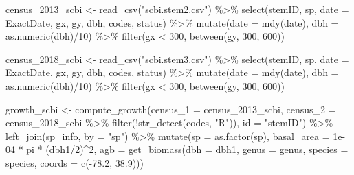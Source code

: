 \documentclass[12pt]{article}
\newenvironment{Shaded}{\begin{snugshade}}{\end{snugshade}}
\newcommand{\AttributeTok}[1]{\textcolor[rgb]{0.77,0.63,0.00}{#1}}
\newcommand{\DecValTok}[1]{\textcolor[rgb]{0.00,0.00,0.81}{#1}}
\newcommand{\FloatTok}[1]{\textcolor[rgb]{0.00,0.00,0.81}{#1}}
\newcommand{\FunctionTok}[1]{\textcolor[rgb]{0.00,0.00,0.00}{#1}}
\newcommand{\NormalTok}[1]{#1}
\newcommand{\OtherTok}[1]{\textcolor[rgb]{0.56,0.35,0.01}{#1}}
\newcommand{\SpecialCharTok}[1]{\textcolor[rgb]{0.00,0.00,0.00}{#1}}
\newcommand{\StringTok}[1]{\textcolor[rgb]{0.31,0.60,0.02}{#1}}
\begin{document}
\begin{Shaded}
\begin{Highlighting}[]
\NormalTok{census\_2013\_scbi }\OtherTok{\textless{}{-}} \FunctionTok{read\_csv}\NormalTok{(}\StringTok{"scbi.stem2.csv"}\NormalTok{) }\SpecialCharTok{\%\textgreater{}\%}
    \FunctionTok{select}\NormalTok{(stemID, sp, }\AttributeTok{date =}\NormalTok{ ExactDate, gx, gy, dbh, codes, status) }\SpecialCharTok{\%\textgreater{}\%}
    \FunctionTok{mutate}\NormalTok{(}\AttributeTok{date =} \FunctionTok{mdy}\NormalTok{(date), }\AttributeTok{dbh =} \FunctionTok{as.numeric}\NormalTok{(dbh)}\SpecialCharTok{/}\DecValTok{10}\NormalTok{) }\SpecialCharTok{\%\textgreater{}\%}
    \FunctionTok{filter}\NormalTok{(gx }\SpecialCharTok{\textless{}} \DecValTok{300}\NormalTok{, }\FunctionTok{between}\NormalTok{(gy, }\DecValTok{300}\NormalTok{, }\DecValTok{600}\NormalTok{))}

\NormalTok{census\_2018\_scbi }\OtherTok{\textless{}{-}} \FunctionTok{read\_csv}\NormalTok{(}\StringTok{"scbi.stem3.csv"}\NormalTok{) }\SpecialCharTok{\%\textgreater{}\%}
    \FunctionTok{select}\NormalTok{(stemID, sp, }\AttributeTok{date =}\NormalTok{ ExactDate, gx, gy, dbh, codes, status) }\SpecialCharTok{\%\textgreater{}\%}
    \FunctionTok{mutate}\NormalTok{(}\AttributeTok{date =} \FunctionTok{mdy}\NormalTok{(date), }\AttributeTok{dbh =} \FunctionTok{as.numeric}\NormalTok{(dbh)}\SpecialCharTok{/}\DecValTok{10}\NormalTok{) }\SpecialCharTok{\%\textgreater{}\%}
    \FunctionTok{filter}\NormalTok{(gx }\SpecialCharTok{\textless{}} \DecValTok{300}\NormalTok{, }\FunctionTok{between}\NormalTok{(gy, }\DecValTok{300}\NormalTok{, }\DecValTok{600}\NormalTok{))}

\NormalTok{growth\_scbi }\OtherTok{\textless{}{-}} \FunctionTok{compute\_growth}\NormalTok{(}\AttributeTok{census\_1 =}\NormalTok{ census\_2013\_scbi, }\AttributeTok{census\_2 =}\NormalTok{ census\_2018\_scbi }\SpecialCharTok{\%\textgreater{}\%}
    \FunctionTok{filter}\NormalTok{(}\SpecialCharTok{!}\FunctionTok{str\_detect}\NormalTok{(codes, }\StringTok{"R"}\NormalTok{)), }\AttributeTok{id =} \StringTok{"stemID"}\NormalTok{) }\SpecialCharTok{\%\textgreater{}\%}
    \FunctionTok{left\_join}\NormalTok{(sp\_info, }\AttributeTok{by =} \StringTok{"sp"}\NormalTok{) }\SpecialCharTok{\%\textgreater{}\%}
    \FunctionTok{mutate}\NormalTok{(}\AttributeTok{sp =} \FunctionTok{as.factor}\NormalTok{(sp), }\AttributeTok{basal\_area =} \FloatTok{1e{-}04} \SpecialCharTok{*}\NormalTok{ pi }\SpecialCharTok{*}\NormalTok{ (dbh1}\SpecialCharTok{/}\DecValTok{2}\NormalTok{)}\SpecialCharTok{\^{}}\DecValTok{2}\NormalTok{, }\AttributeTok{agb =} \FunctionTok{get\_biomass}\NormalTok{(}\AttributeTok{dbh =}\NormalTok{ dbh1,}
        \AttributeTok{genus =}\NormalTok{ genus, }\AttributeTok{species =}\NormalTok{ species, }\AttributeTok{coords =} \FunctionTok{c}\NormalTok{(}\SpecialCharTok{{-}}\FloatTok{78.2}\NormalTok{, }\FloatTok{38.9}\NormalTok{)))}


\end{Highlighting}
\end{Shaded}
\end{document}
